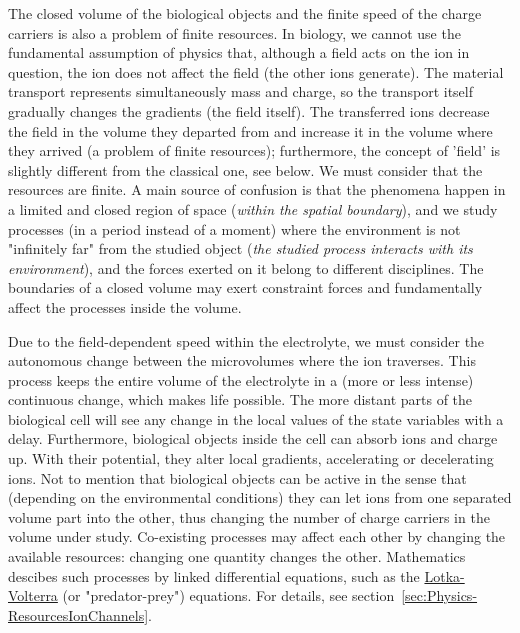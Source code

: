 The closed volume of the biological objects and the finite speed of the charge carriers is also
a problem of finite resources. In biology, we cannot use the
fundamental assumption of physics that, although a field acts on the 
ion in question, the ion does not affect the field (the other ions generate).
The material transport represents simultaneously mass and charge,
so the transport itself gradually changes the gradients (the field itself). 
The transferred ions decrease the field in the volume they departed from
and increase it in the volume where they arrived
(a problem of finite resources); furthermore, the concept of 'field' is slightly different from the classical one, see
below.
We must consider that the resources are finite. A main source of confusion is that the phenomena happen in a limited and closed region of space (\textit{within the spatial boundary}), and we study processes (in a period instead of a moment) where the environment is not "infinitely far" from the studied object (\textit{the studied process interacts with its environment}), and
the forces exerted on it belong to different disciplines.
The boundaries of a closed volume
may exert constraint forces and fundamentally affect the processes inside the volume.


Due to the 
field-dependent speed within the electrolyte, we must consider the autonomous
change between the microvolumes where the ion traverses. 
This process keeps the entire volume of the electrolyte in a (more or less intense) continuous change, which makes life possible.
The more distant parts of the biological cell will see any change in the local values of the state variables with a delay. 
Furthermore, biological objects inside the cell
can absorb ions and charge up. With their potential, they alter local gradients, accelerating or decelerating ions.  
Not to mention that biological objects can be active in the sense that 
(depending on the environmental conditions) they can let ions from one separated volume part into the other, thus changing the number of 
charge carriers in the volume under study.
Co-existing processes may affect each other by \hypertarget{ChangingResources}{changing the available resources}:
changing one quantity changes the other.
Mathematics descibes such processes by linked differential equations, such as the \href{https://en.wikipedia.org/wiki/Lotka-Volterra_equations}{Lotka-Volterra} (or \hypertarget{predator_prey}{"predator-prey"}) equations.
For details, see section~\ref{sec:Physics-ResourcesIonChannels}.


